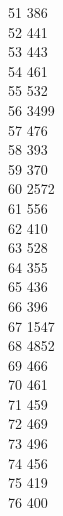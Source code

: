{ 51	386 \\
 52	441 \\
 53	443 \\
 54	461 \\
 55	532 \\
 56	3499 \\
 57	476 \\
 58	393 \\
 59	370 \\
 60	2572 \\
 61	556 \\
 62	410 \\
 63	528 \\
 64	355 \\
 65	436 \\
 66	396 \\
 67	1547 \\
 68	4852 \\
 69	466 \\
 70	461 \\
 71	459 \\
 72	469 \\
 73	496 \\
 74	456 \\
 75	419 \\
 76	400 \\
}
